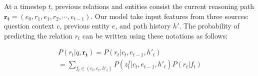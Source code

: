 At a timestep $t$, previous relations and entities consist the current reasoning path $\mathbf{r_t} = (e_{0},r_{1},e_{1},r_{2}, \cdots,e_{t-1})$. Our model take input features from three sources: question context $c$, previous entity $e$, and path history $h'$. The probability of predicting the relation $r_t$ can be written using these notations as follows:


\begin{equation}
\begin{aligned}
P(r_t|q,\mathbf{r_t}) = P(r_t|c_t, e_{t-1}, h'_t) \\
       = \sum_{f_t \in (c_t,e_t,h'_t)}P(z_t^f|c_t,e_{t-1},h'_t)P(r_t|f_t)
\end{aligned}
\end{equation}
